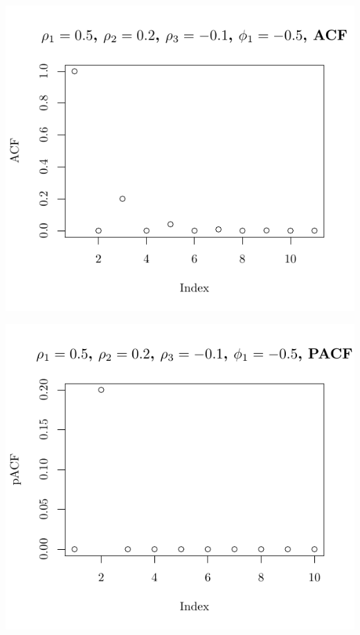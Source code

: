 \documentclass[10pt]{paper}\usepackage[]{graphicx}\usepackage[]{color}
\makeatletter
\def\maxwidth{ %
  \ifdim\Gin@nat@width>\linewidth
    \linewidth
  \else
    \Gin@nat@width
  \fi
}
\newenvironment{knitrout}{}{} %
\makeatother
\begin{document}
\begin{knitrout}
{\centering \includegraphics[width=\maxwidth]{figure/graphics-plotter-137} 

}




{\centering \includegraphics[width=\maxwidth]{figure/graphics-plotter-138} 

}





\end{knitrout}
\end{document}

